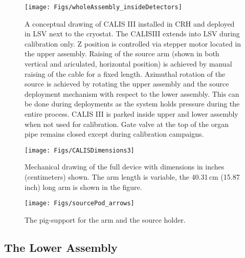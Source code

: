 \begin{figure}[htbp]
 \centering
 \texttt{[image: Figs/wholeAssembly\_insideDetectors]}
 \caption{A conceptual drawing of CALIS III installed in CRH and deployed in LSV next to the cryostat. The CALISIII extends into LSV during calibration only. Z position is controlled via stepper motor located in the upper assembly. Raising of the source arm (shown in both vertical and ariculated, horizontal position) is achieved by manual raising of the cable for a fixed length. Azimuthal rotation of the source is achieved by rotating the upper assembly and the source deployment mechanism with respect to the lower assembly. This can be done during deployments as the system holds pressure during the entire process. CALIS III is parked inside upper and lower assembly when not used for calibration. Gate valve at the top of the organ pipe remains closed except during calibration campaigns.}
\label{fig:wholeAssembly_insideDetectors}
\end{figure}


\begin{figure}[htbp]
 \centering
 \texttt{[image: Figs/CALISDimensions3]}
 \caption{Mechanical drawing of the full device with dimensions in inches (centimeters) shown. The arm length is variable, the 40.31\,cm (15.87\,inch) long arm is shown in the figure.}
 \label{fig:CALISDimensions3}
\end{figure}


\begin{figure}[htbp]
 \centering
  \texttt{[image: Figs/sourcePod\_arrows]}
  \caption{The pig-support for the arm and the source holder.}
  \label{fig:sourcePod_arrows}
\end{figure}

 \subsection{The Lower Assembly} \label{The Lower Assembly}
